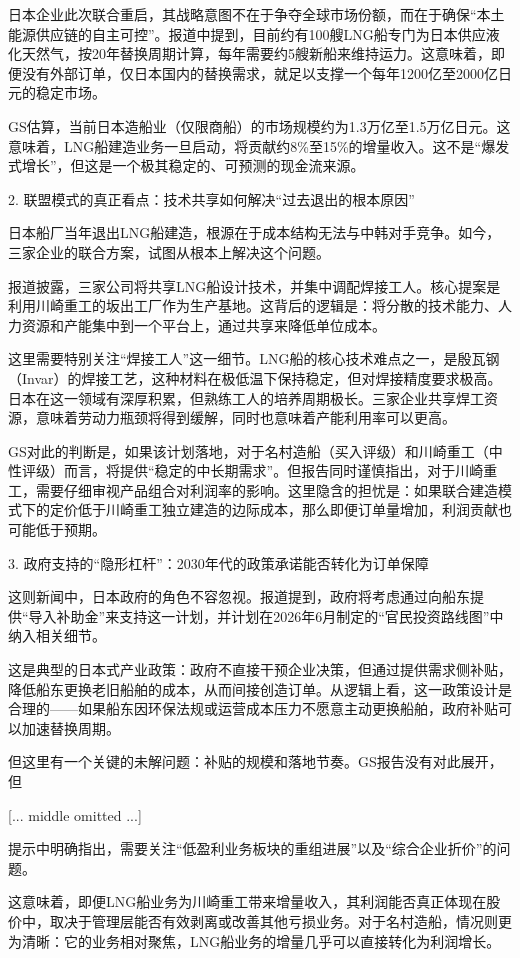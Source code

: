 \documentclass[11pt]{ctexart}
\begin{document}
日本企业此次联合重启，其战略意图不在于争夺全球市场份额，而在于确保“本土能源供应链的自主可控”。报道中提到，目前约有100艘LNG船专门为日本供应液化天然气，按20年替换周期计算，每年需要约5艘新船来维持运力。这意味着，即便没有外部订单，仅日本国内的替换需求，就足以支撑一个每年1200亿至2000亿日元的稳定市场。

GS估算，当前日本造船业（仅限商船）的市场规模约为1.3万亿至1.5万亿日元。这意味着，LNG船建造业务一旦启动，将贡献约8\%至15\%的增量收入。这不是“爆发式增长”，但这是一个极其稳定的、可预测的现金流来源。

2. 联盟模式的真正看点：技术共享如何解决“过去退出的根本原因”

日本船厂当年退出LNG船建造，根源在于成本结构无法与中韩对手竞争。如今，三家企业的联合方案，试图从根本上解决这个问题。

报道披露，三家公司将共享LNG船设计技术，并集中调配焊接工人。核心提案是利用川崎重工的坂出工厂作为生产基地。这背后的逻辑是：将分散的技术能力、人力资源和产能集中到一个平台上，通过共享来降低单位成本。

这里需要特别关注“焊接工人”这一细节。LNG船的核心技术难点之一，是殷瓦钢（Invar）的焊接工艺，这种材料在极低温下保持稳定，但对焊接精度要求极高。日本在这一领域有深厚积累，但熟练工人的培养周期极长。三家企业共享焊工资源，意味着劳动力瓶颈将得到缓解，同时也意味着产能利用率可以更高。

GS对此的判断是，如果该计划落地，对于名村造船（买入评级）和川崎重工（中性评级）而言，将提供“稳定的中长期需求”。但报告同时谨慎指出，对于川崎重工，需要仔细审视产品组合对利润率的影响。这里隐含的担忧是：如果联合建造模式下的定价低于川崎重工独立建造的边际成本，那么即便订单量增加，利润贡献也可能低于预期。

3. 政府支持的“隐形杠杆”：2030年代的政策承诺能否转化为订单保障

这则新闻中，日本政府的角色不容忽视。报道提到，政府将考虑通过向船东提供“导入补助金”来支持这一计划，并计划在2026年6月制定的“官民投资路线图”中纳入相关细节。

这是典型的日本式产业政策：政府不直接干预企业决策，但通过提供需求侧补贴，降低船东更换老旧船舶的成本，从而间接创造订单。从逻辑上看，这一政策设计是合理的——如果船东因环保法规或运营成本压力不愿意主动更换船舶，政府补贴可以加速替换周期。

但这里有一个关键的未解问题：补贴的规模和落地节奏。GS报告没有对此展开，但

[... middle omitted ...]

提示中明确指出，需要关注“低盈利业务板块的重组进展”以及“综合企业折价”的问题。

这意味着，即便LNG船业务为川崎重工带来增量收入，其利润能否真正体现在股价中，取决于管理层能否有效剥离或改善其他亏损业务。对于名村造船，情况则更为清晰：它的业务相对聚焦，LNG船业务的增量几乎可以直接转化为利润增长。
\end{document}
